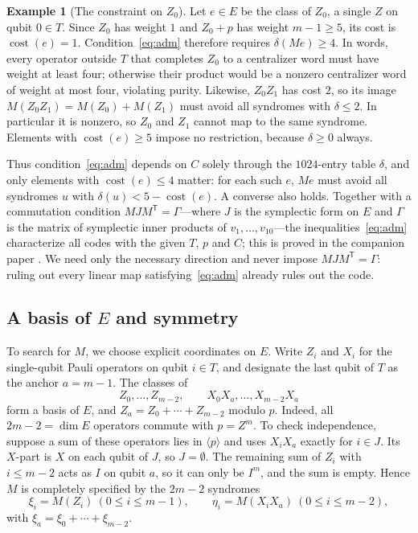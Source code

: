 \documentclass[11pt]{article}
\theoremstyle{definition}
\newtheorem{example}[theorem]{Example}
\theoremstyle{remark}
\newcommand{\cost}{\operatorname{cost}}
\newcommand{\tr}{\mathsf T}
\begin{document}
\begin{example}[The constraint on \(Z_0\)]
Let \(e\in E\) be the class of \(Z_0\), a single \(Z\) on qubit
\(0\in T\). Since \(Z_0\) has weight \(1\) and \(Z_0+p\) has weight
\(m-1\geq5\), its cost is \(\cost(e)=1\). Condition~\eqref{eq:adm}
therefore requires \(\delta(Me)\geq4\). In words, every operator outside
\(T\) that completes \(Z_0\) to a centralizer word must have weight at
least four; otherwise their product would be a nonzero centralizer word
of weight at most four, violating purity. Likewise, \(Z_0Z_1\) has cost
\(2\), so its image \(M(Z_0Z_1)=M(Z_0)+M(Z_1)\) must avoid all syndromes
with \(\delta\leq2\). In particular it is nonzero, so \(Z_0\) and
\(Z_1\) cannot map to the same syndrome. Elements with \(\cost(e)\geq5\)
impose no restriction, because \(\delta\geq0\) always.
\end{example}

Thus condition~\eqref{eq:adm} depends on \(C\) solely through the
\(1024\)-entry table \(\delta\), and only elements with
\(\cost(e)\leq4\) matter: for each such \(e\), \(Me\) must avoid all
syndromes \(u\) with \(\delta(u)<5-\cost(e)\). A converse also holds.
Together with a commutation condition \(MJM^\tr=\Gamma\)---where \(J\)
is the symplectic form on \(E\) and \(\Gamma\) is the matrix of
symplectic inner products of \(v_1,\ldots,v_{10}\)---the
inequalities~\eqref{eq:adm} characterize all codes with the given \(T\),
\(p\) and \(C\); this is proved in the companion paper \cite{li17}. We
need only the necessary direction and never impose \(MJM^\tr=\Gamma\):
ruling out every linear map satisfying~\eqref{eq:adm} already rules out
the code.

\subsection{A basis of \texorpdfstring{\(E\)}{E} and symmetry}

To search for \(M\), we choose explicit coordinates on \(E\). Write
\(Z_i\) and \(X_i\) for the single-qubit Pauli operators on qubit
\(i\in T\), and designate the last qubit of \(T\) as the anchor
\(a=m-1\). The classes of
\[
 Z_0,\ldots,Z_{m-2},\qquad X_0X_a,\ldots,X_{m-2}X_a
\]
form a basis of \(E\), and \(Z_a=Z_0+\cdots+Z_{m-2}\) modulo \(p\).
Indeed, all \(2m-2=\dim E\) operators commute with \(p=Z^m\). To check
independence, suppose a sum of these operators lies in
\(\langle p\rangle\) and uses \(X_iX_a\) exactly for \(i\in J\). Its
\(X\)-part is \(X\) on each qubit of \(J\), so \(J=\emptyset\). The
remaining sum of \(Z_i\) with \(i\leq m-2\) acts as \(I\) on qubit
\(a\), so it can only be \(I^m\), and the sum is empty. Hence \(M\) is
completely specified by the \(2m-2\) syndromes
\[
 \xi_i=M(Z_i)\ (0\leq i\leq m-1),\qquad \eta_i=M(X_iX_a)\ (0\leq i\leq m-2),
\]
with \(\xi_a=\xi_0+\cdots+\xi_{m-2}\).
\end{document}
